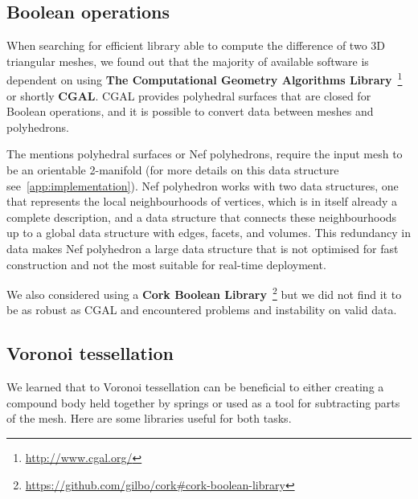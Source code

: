 \subsection{Boolean operations}
When searching for efficient library able to compute the difference of two 3D triangular meshes, we found out that the majority of available software
is dependent on using \textbf{The Computational Geometry Algorithms Library}~\footnote{\url{http://www.cgal.org/}} or shortly \textbf{CGAL}. CGAL provides polyhedral surfaces that are closed for Boolean operations, and it is possible to convert data between meshes and polyhedrons. 

The mentions polyhedral surfaces or Nef polyhedrons, require the input mesh to be an orientable 2-manifold (for more details on this data structure see~\cref{app:implementation}). Nef polyhedron works with two data structures, one that represents the local neighbourhoods of vertices, which is in itself already a complete description, and a data structure that connects these neighbourhoods up to a global data structure with edges, facets, and volumes. This redundancy in data makes Nef polyhedron a large data structure that is not optimised for fast construction and not the most suitable for real-time deployment.

We also considered using a \textbf{Cork Boolean Library}~\footnote{\url{https://github.com/gilbo/cork\#cork-boolean-library}} but we did not find it to be as robust as CGAL and encountered problems and instability on valid data.

\subsection{Voronoi tessellation}
We learned that to Voronoi tessellation can be beneficial to either creating a compound body held together by springs or used as a tool for subtracting parts of the mesh. Here are some libraries useful for both tasks.

